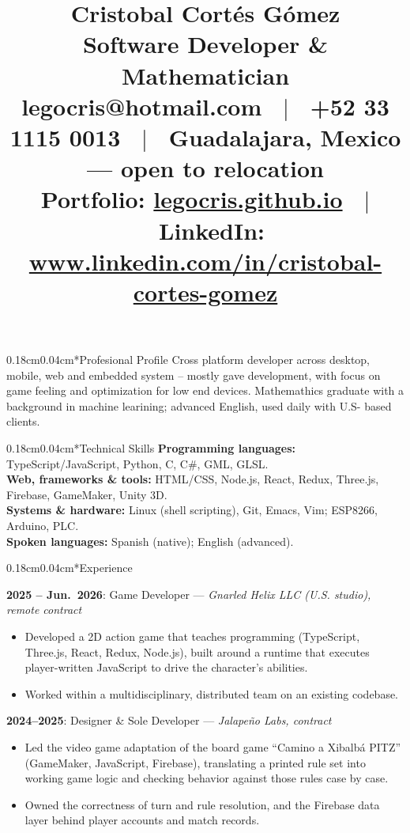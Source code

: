 \documentclass[10.5pt]{article}
\title{\vspace{-1.5cm} \Huge{Cristobal Cortés Gómez} \\ \large{Software Developer \& Mathematician} \\
\vspace{0.25cm}
\normalsize{
legocris@hotmail.com \ $|$ \ +52 33 1115 0013 \ $|$ \ Guadalajara, Mexico --- open to relocation \\
Portfolio: \url{legocris.github.io} \ $|$ \ LinkedIn: \url{www.linkedin.com/in/cristobal-cortes-gomez}
}
\vspace{-1cm}}
\author{}
\date{}
\makeatletter
\renewcommand{\section}{\@startsection{section}{1}{0pt}%
  {0.18cm}{0.04cm}{\normalfont\large\bfseries}}
\makeatother
\begin{document}
\pagestyle{empty}

\maketitle
\thispagestyle{empty}

\section*{Profesional Profile}
Cross platform developer across desktop, mobile, web and embedded system -- mostly gave development, with focus on game feeling and optimization for low end devices. Mathemathics graduate with a background in machine learining; advanced English, used daily with U.S- based clients.

\section*{Technical Skills}
\textbf{Programming languages:} TypeScript/JavaScript, Python, C, C\#, GML, GLSL. \\
\textbf{Web, frameworks \& tools:} HTML/CSS, Node.js, React, Redux, Three.js, Firebase, GameMaker, Unity 3D. \\
\textbf{Systems \& hardware:} Linux (shell scripting), Git, Emacs, Vim; ESP8266, Arduino, PLC. \\
\textbf{Spoken languages:} Spanish (native); English (advanced).

\section*{Experience}

\textbf{2025 -- Jun.\ 2026}: Game Developer --- \textit{Gnarled Helix LLC (U.S. studio), remote contract}
\begin{itemize}
    \item Developed a 2D action game that teaches programming (TypeScript, Three.js, React, Redux, Node.js), built around a runtime that executes player-written JavaScript to drive the character's abilities.
    \item Worked within a multidisciplinary, distributed team on an existing codebase.
\end{itemize}

\textbf{2024--2025}: Designer \& Sole Developer --- \textit{Jalapeño Labs, contract}
\begin{itemize}
    \item Led the video game adaptation of the board game ``Camino a Xibalbá PITZ'' (GameMaker, JavaScript, Firebase), translating a printed rule set into working game logic and checking behavior against those rules case by case.
    \item Owned the correctness of turn and rule resolution, and the Firebase data layer behind player accounts and match records.
\end{itemize}
\end{document}
